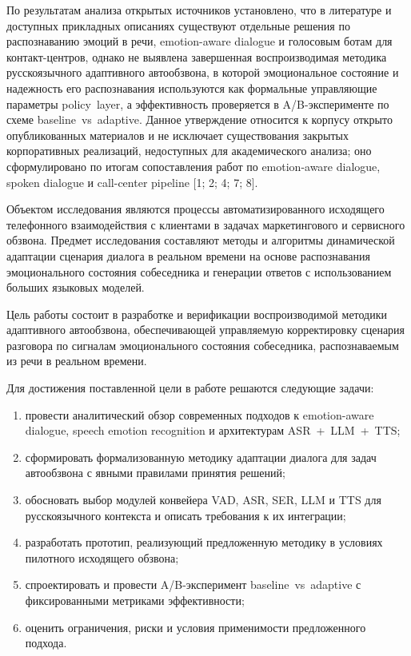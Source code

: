 \documentclass[a4paper,14pt]{extarticle}
\renewcommand{\texttt}[1]{\textnormal{#1}}
\providecommand{\tightlist}{%
  \setlength{\itemsep}{0pt}\setlength{\parskip}{0pt}}
\begin{document}
По результатам анализа открытых источников установлено, что в литературе
и доступных прикладных описаниях существуют отдельные решения по
распознаванию эмоций в речи, emotion-aware dialogue и голосовым ботам
для контакт-центров, однако не выявлена завершенная воспроизводимая
методика русскоязычного адаптивного автообзвона, в которой эмоциональное
состояние и надежность его распознавания используются как формальные
управляющие параметры \texttt{policy\ layer}, а эффективность
проверяется в A/B-эксперименте по схеме \texttt{baseline\ vs\ adaptive}.
Данное утверждение относится к корпусу открыто опубликованных материалов
и не исключает существования закрытых корпоративных реализаций,
недоступных для академического анализа; оно сформулировано по итогам
сопоставления работ по emotion-aware dialogue, spoken dialogue и
call-center pipeline {[}1; 2; 4; 7; 8{]}.

Объектом исследования являются процессы автоматизированного исходящего
телефонного взаимодействия с клиентами в задачах маркетингового и
сервисного обзвона. Предмет исследования составляют методы и алгоритмы
динамической адаптации сценария диалога в реальном времени на основе
распознавания эмоционального состояния собеседника и генерации ответов с
использованием больших языковых моделей.

Цель работы состоит в разработке и верификации воспроизводимой методики
адаптивного автообзвона, обеспечивающей управляемую корректировку
сценария разговора по сигналам эмоционального состояния собеседника,
распознаваемым из речи в реальном времени.

Для достижения поставленной цели в работе решаются следующие задачи:

\begin{enumerate}
\def\labelenumi{\arabic{enumi})}
\tightlist
\item
  провести аналитический обзор современных подходов к emotion-aware
  dialogue, speech emotion recognition и архитектурам
  \texttt{ASR\ +\ LLM\ +\ TTS};
\item
  сформировать формализованную методику адаптации диалога для задач
  автообзвона с явными правилами принятия решений;
\item
  обосновать выбор модулей конвейера \texttt{VAD}, \texttt{ASR},
  \texttt{SER}, \texttt{LLM} и \texttt{TTS} для русскоязычного контекста
  и описать требования к их интеграции;
\item
  разработать прототип, реализующий предложенную методику в условиях
  пилотного исходящего обзвона;
\item
  спроектировать и провести A/B-эксперимент
  \texttt{baseline\ vs\ adaptive} с фиксированными метриками
  эффективности;
\item
  оценить ограничения, риски и условия применимости предложенного
  подхода.
\end{enumerate}
\end{document}
